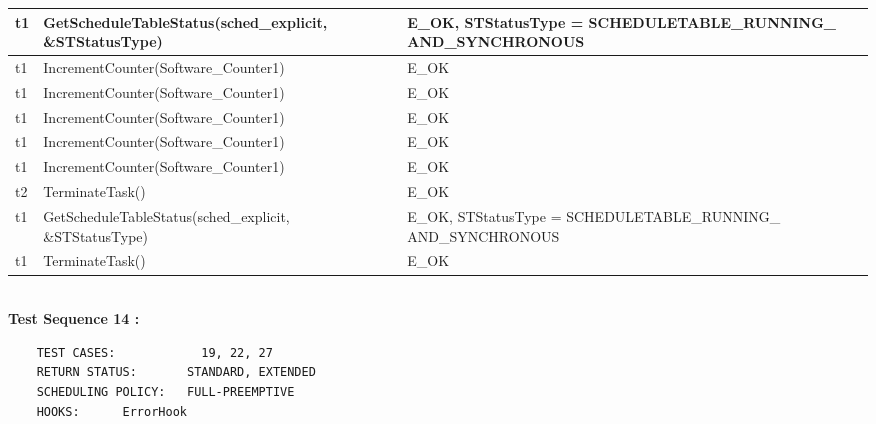 \documentclass[10pt]{article}
\newlength{\Li}\settowidth{\Li}{Running}
\newlength{\Lii}\setlength{\Lii}{7cm}
\newlength{\Liiii}\setlength{\Liiii}{0.9cm}
\newlength{\Liii}\setlength{\Liii}{\textwidth} \addtolength{\Liii}{-\Li} \addtolength{\Liii}{-\Lii} \addtolength{\Liii}{-\Liiii}
\begin{document}
\begin{supertabular}{|p{\Li}|p{\Lii}|p{\Liii}|p{\Liiii}|}
	t1		& GetScheduleTableStatus(sched\_explicit, \&STStatusType)			& E\_OK, STStatusType = SCHEDULETABLE\_RUNNING\_ AND\_SYNCHRONOUS		& \\ \hline
	t1		& IncrementCounter(Software\_Counter1)						& E\_OK																	& \\ \hline
	t1		& IncrementCounter(Software\_Counter1)						& E\_OK																	& \\ \hline
	t1		& IncrementCounter(Software\_Counter1)						& E\_OK																	& \\ \hline
	t1		& IncrementCounter(Software\_Counter1)						& E\_OK																	& \\ \hline
	t1		& IncrementCounter(Software\_Counter1)						& E\_OK																	& \\ \hline
	t2		& TerminateTask()											& E\_OK																	& \\ \hline
	t1		& GetScheduleTableStatus(sched\_explicit, \&STStatusType)			& E\_OK, STStatusType = SCHEDULETABLE\_RUNNING\_ AND\_SYNCHRONOUS		& \\ \hline
	t1		& TerminateTask()											& E\_OK																	& \\ \hline
	\end{supertabular}\\
	
	\textbf{Test Sequence 14 :}
	\begin{lstlisting}
	TEST CASES:		       19, 22, 27
	RETURN STATUS:	  	 STANDARD, EXTENDED
	SCHEDULING POLICY:   FULL-PREEMPTIVE
	HOOKS:		ErrorHook
	\end{lstlisting}
	
	
\end{document}
